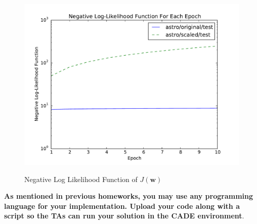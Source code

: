 \begin{enumerate}
\begin{itemize}
\begin{figure}[!h]
\centering
\includegraphics[width=.65\textwidth]{SGD-results_final.pdf}
\label{fig:neg_loger}
\caption{Negative Log Likelihood Function of $J(\mathbf{w})$}
\end{figure}
\end{itemize}


\end{enumerate}

{\bf As mentioned in previous homeworks, you may use any programming
  language for your implementation. Upload your code along with a
  script so the TAs can run your solution in the CADE environment}.






